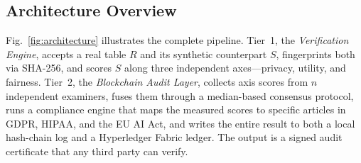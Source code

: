 
\subsection{Architecture Overview}

Fig.~\ref{fig:architecture} illustrates the complete pipeline. Tier~1, the \emph{Verification Engine}, accepts a real table $R$ and its synthetic counterpart $S$, fingerprints both via SHA-256, and scores $S$ along three independent axes---privacy, utility, and fairness. Tier~2, the \emph{Blockchain Audit Layer}, collects axis scores from $n$ independent examiners, fuses them through a median-based consensus protocol, runs a compliance engine that maps the measured scores to specific articles in GDPR, HIPAA, and the EU AI Act, and writes the entire result to both a local hash-chain log and a Hyperledger Fabric ledger. The output is a signed audit certificate that any third party can verify.

